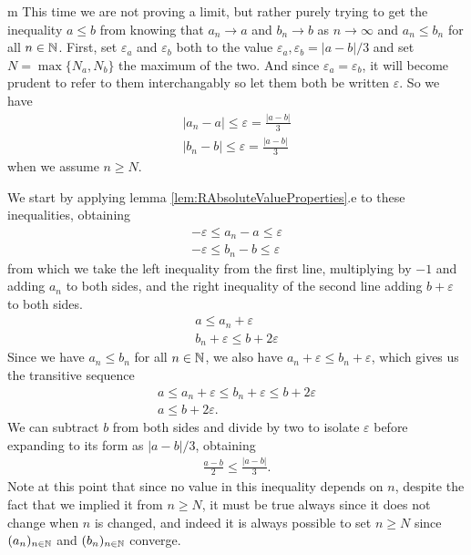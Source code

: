\documentclass[11pt]{article}
\begin{document}
\begin{my proof}{m}
This time we are not proving a limit, but rather purely trying to get the inequality $a \le b$ from knowing that $a_n \to a$ and $b_n \to b$ as $n \to \infty$ and $a_n \le b_n$ for all $n \in \mathbb{N}$. First, set $\varepsilon_a$ and $\varepsilon_b$ both to the value $\varepsilon_a,\varepsilon_b = |a-b|/3$ and set $N = \max\{N_a, N_b\}$ the maximum of the two. And since $\varepsilon_a = \varepsilon_b$, it will become prudent to refer to them interchangably so let them both be written $\varepsilon$. So we have \begin{gather*}
|a_n - a| \le \varepsilon = \frac{|a- b|}{3} \\
|b_n - b| \le \varepsilon = \frac{|a- b|}{3}
\end{gather*}
when we assume $n \ge N$.

We start by applying lemma \ref{lem:RAbsoluteValueProperties}.e to these inequalities, obtaining \begin{gather*}
-\varepsilon \le a_n - a \le \varepsilon \\
- \varepsilon \le b_n - b \le \varepsilon
\end{gather*}
from which we take the left inequality from the first line, multiplying by $-1$ and adding $a_n$ to both sides, and the right inequality of the second line adding $b + \varepsilon$ to both sides. \begin{gather*}
a \le a_n + \varepsilon \\
b_n + \varepsilon \le b + 2\varepsilon
\end{gather*}
Since we have $a_n \le b_n$ for all $n\in \mathbb{N}$, we also have $a_n + \varepsilon \le b_n + \varepsilon$, which gives us the transitive sequence \begin{gather*}
a \le a_n + \varepsilon \le b_n + \varepsilon \le b + 2\varepsilon \\
a \le b + 2\varepsilon.
\end{gather*}
We can subtract $b$ from both sides and divide by two to isolate $\varepsilon$ before expanding to its form as $|a-b|/3$, obtaining \begin{gather*}
\frac{a-b}{2} \le \frac{|a-b|}{3}.
\end{gather*}
Note at this point that since no value in this inequality depends on $n$, despite the fact that we implied it from $n \ge N$, it must be true always since it does not change when $n$ is changed, and indeed it is always possible to set $n \ge N$ since $(a_n)_{n\in \mathbb{N}}$ and $(b_n)_{n\in \mathbb{N}}$ converge.



\end{my proof}
\end{document}
